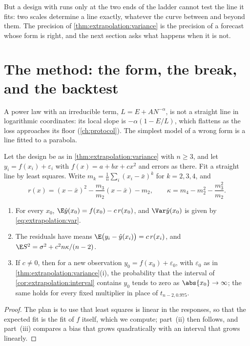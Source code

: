 \begin{refsection}
But a design with runs only at the two ends of the ladder cannot test the line it fits: two scales determine a line exactly, whatever the curve between and beyond them. The precision of \cref{thm:extrapolation:variance} is the precision of a forecast whose form is right, and the next section asks what happens when it is not.

\section{The method: the form, the break, and the backtest}\label{sec:extrapolation:form}

A power law with an irreducible term, $L=E+AN^{-\alpha}$, is not a straight line in logarithmic coordinates: its local slope is $-\alpha(1-E/L)$, which flattens as the loss approaches its floor (\cref{ch:protocol}). The simplest model of a wrong form is a line fitted to a parabola.

\begin{proposition}\label{prop:extrapolation:misspec}
Let the design be as in \cref{thm:extrapolation:variance} with $n\ge3$, and let $y_i=f(x_i)+\varepsilon_i$ with $f(x)=a+bx+cx^2$ and errors as there. Fit a straight line by least squares. Write $m_k=\frac1n\sum_i(x_i-\bar x)^k$ for $k=2,3,4$, and
\[
r(x)=(x-\bar x)^2-\frac{m_3}{m_2}(x-\bar x)-m_2,\qquad\kappa=m_4-m_2^2-\frac{m_3^2}{m_2}.
\]
\begin{enumerate}
\item For every $x_0$, $\E\hat y(x_0)=f(x_0)-c\,r(x_0)$, and $\Var\hat y(x_0)$ is given by \eqref{eq:extrapolation:var}.
\item The residuals have means $\E\bigl(y_i-\hat y(x_i)\bigr)=c\,r(x_i)$, and $\E S^2=\sigma^2+c^2n\kappa/(n-2)$.
\item If $c\ne0$, then for a new observation $y_0=f(x_0)+\varepsilon_0$, with $\varepsilon_0$ as in \cref{thm:extrapolation:variance}(i), the probability that the interval of \cref{cor:extrapolation:interval} contains $y_0$ tends to zero as $\abs{x_0}\to\infty$; the same holds for every fixed multiplier in place of $t_{n-2,0.975}$.
\end{enumerate}
\end{proposition}

\begin{proof}
The plan is to use that least squares is linear in the responses, so that the expected fit is the fit of $f$ itself, which we compute; part~(ii) then follows, and part~(iii) compares a bias that grows quadratically with an interval that grows linearly.


\end{proof}
\end{refsection}

